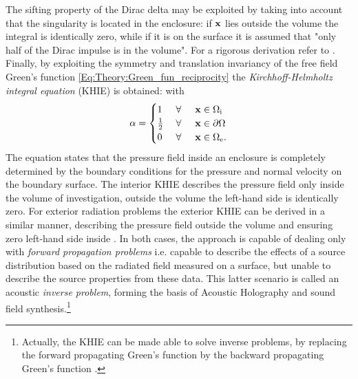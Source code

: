 The sifting property of the Dirac delta may be exploited by taking into account that the singularity is located in the enclosure:
if $\mathbf{x}$ lies outside the volume the integral is identically zero, while if it is on the surface it is assumed that "only half of the Dirac impulse is in the volume".
For a rigorous derivation refer to \cite{Williams1999}.
Finally, by exploiting the symmetry and translation invariancy of the free field Green's function \eqref{Eq:Theory:Green_fun_reciprocity} the \emph{Kirchhoff-Helmholtz integral equation} (KHIE) is obtained:
%
%
with
\begin{equation*}
\alpha = \begin{cases} 
1           & \hspace{1mm} \forall \hspace{5mm}  \mathbf{x} \in \Omega_{\mathrm{i}}  	   \\
\frac{1}{2} & \hspace{1mm} \forall \hspace{5mm}  \mathbf{x} \in \partial \Omega  \\
0 			& \hspace{1mm} \forall \hspace{5mm}  \mathbf{x} \in \Omega_{\mathrm{e}}.
\end{cases}
\end{equation*}
The equation states that the pressure field inside an enclosure is completely determined by the boundary conditions for the pressure and normal velocity on the boundary surface.
The interior KHIE describes the pressure field only inside the volume of investigation, outside the volume the left-hand side is identically zero. 
For exterior radiation problems the exterior KHIE can be derived in a similar manner, describing the pressure field outside the volume and ensuring zero left-hand side inside \cite{Williams1999}.
In both cases, the approach is capable of dealing only with \emph{forward propagation problems} i.e. capable to describe the effects of a source distribution based on the radiated field measured on a surface, but unable to describe the source properties from these data. 
This latter scenario is called an acoustic \emph{inverse problem}, forming the basis of Acoustic Holography and sound field synthesis.\footnote{Actually, the KHIE can be made able to solve inverse problems, by replacing the forward propagating Green's function by the backward propagating Green's function \cite{Wapenaar1989}.}
\vspace{3mm}

